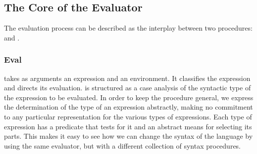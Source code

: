 \subsection{The Core of the Evaluator}
\label{Section 4.1.1}

The evaluation process can be described as the interplay between two procedures:
 and .



\subsubsection*{Eval}

 takes as arguments an expression and an environment.
It classifies the expression and directs its evaluation.
 is structured as a case analysis of the syntactic type of the expression to be evaluated.
In order to keep the procedure general, we express the determination of the type of an expression abstractly, making no commitment to any particular representation for the various types of expressions.
Each type of expression has a predicate that tests for it and an abstract means for selecting its parts.
This  makes it easy to see how we can change the syntax of the language by using the same evaluator, but with a different collection of syntax procedures.

